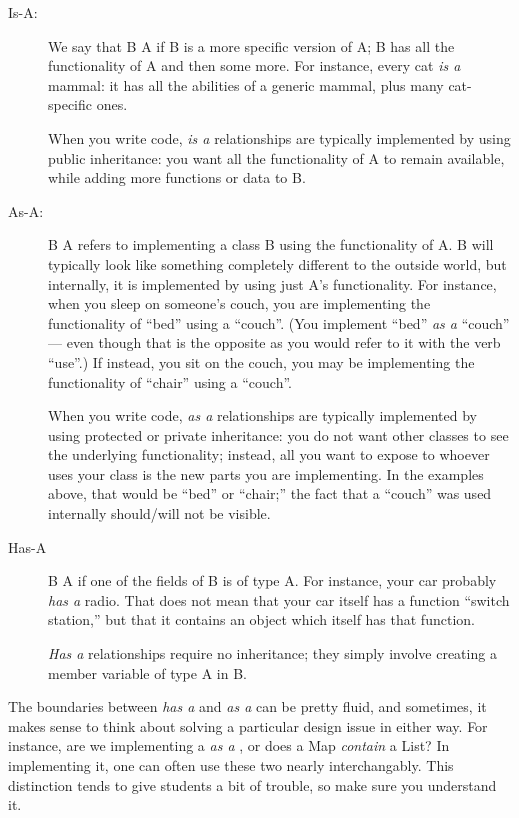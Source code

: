 \begin{description}
\item[Is-A:] We say that B  A if B is a more specific
version of A; B has all the functionality of A and then some more. 
For instance, every cat \emph{is a} mammal: it has all the abilities
of a generic mammal, plus many cat-specific ones.

When you write code, \emph{is a} relationships are typically
implemented by using public inheritance: you want all the
functionality of A to remain available,
while adding more functions or data to B.

\item[As-A:] B  A refers to implementing a class B using
  the functionality of A. B will typically look like something
  completely different to the outside world, but internally, it is
  implemented by using just A's functionality.
For instance, when you sleep on someone's couch,
you are implementing the functionality of ``bed'' using a ``couch''.
(You implement ``bed'' \emph{as a} ``couch''
--- even though that is the opposite as you would refer
to it with the verb ``use''.)
If instead, you sit on the couch, you may be implementing the
functionality of ``chair'' using a ``couch''. 

When you write code, \emph{as a} relationships are typically
implemented by using protected or private inheritance:
you do not want other classes to see the underlying functionality;
instead, all you want to expose to whoever uses your class is the new
parts you are implementing.
In the examples above, that would be ``bed'' or ``chair;''
the fact that a ``couch'' was used internally should/will not be visible.

\item[Has-A] B  A if one of the fields of B is of type A. 
For instance, your car probably \emph{has a} radio.
That does not mean that your car itself has a function ``switch station,''
but that it contains an object which itself has that function.

\emph{Has a} relationships require no inheritance;
they simply involve creating a member variable of type A in B. 
\end{description}

The boundaries between \emph{has a} and \emph{as a} can be pretty
fluid, and sometimes, it makes sense to think about solving a
particular design issue in either way. 
For instance, are we implementing a  \emph{as a}
, or does a Map \emph{contain} a List?
In implementing it, one can often use these two nearly
interchangably.
This distinction tends to give students a bit of trouble,
so make sure you understand it.

